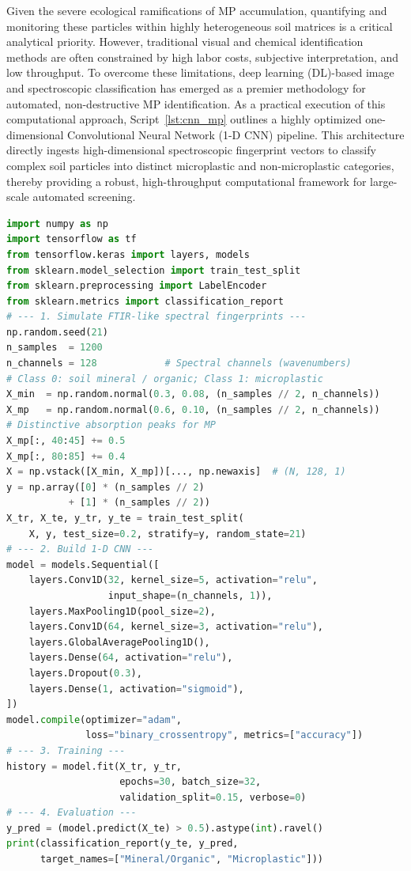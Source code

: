 \documentclass[environments,article,submit,pdftex,moreauthors]{Definitions/mdpi}
\begin{document}
Given the severe ecological ramifications of MP accumulation, quantifying and monitoring these particles within highly heterogeneous soil matrices is a critical analytical priority. However, traditional visual and chemical identification methods are often constrained by high labor costs, subjective interpretation, and low throughput. To overcome these limitations, deep learning (DL)-based image and spectroscopic classification has emerged as a premier methodology for automated, non-destructive MP identification. As a practical execution of this computational approach, Script~\ref{lst:cnn_mp} outlines a highly optimized one-dimensional Convolutional Neural Network (1-D CNN) pipeline. This architecture directly ingests high-dimensional spectroscopic fingerprint vectors to classify complex soil particles into distinct microplastic and non-microplastic categories, thereby providing a robust, high-throughput computational framework for large-scale automated screening.

\begin{lstlisting}[language=Python,basicstyle=\scriptsize\ttfamily,
    caption={Python workflow: 1-D Convolutional Neural Network (CNN) for
             microplastic classification from spectral fingerprints
             (Script~3).},
    label={lst:cnn_mp}]
import numpy as np
import tensorflow as tf
from tensorflow.keras import layers, models
from sklearn.model_selection import train_test_split
from sklearn.preprocessing import LabelEncoder
from sklearn.metrics import classification_report
# --- 1. Simulate FTIR-like spectral fingerprints ---
np.random.seed(21)
n_samples  = 1200
n_channels = 128            # Spectral channels (wavenumbers)
# Class 0: soil mineral / organic; Class 1: microplastic
X_min  = np.random.normal(0.3, 0.08, (n_samples // 2, n_channels))
X_mp   = np.random.normal(0.6, 0.10, (n_samples // 2, n_channels))
# Distinctive absorption peaks for MP
X_mp[:, 40:45] += 0.5
X_mp[:, 80:85] += 0.4
X = np.vstack([X_min, X_mp])[..., np.newaxis]  # (N, 128, 1)
y = np.array([0] * (n_samples // 2)
           + [1] * (n_samples // 2))
X_tr, X_te, y_tr, y_te = train_test_split(
    X, y, test_size=0.2, stratify=y, random_state=21)
# --- 2. Build 1-D CNN ---
model = models.Sequential([
    layers.Conv1D(32, kernel_size=5, activation="relu",
                  input_shape=(n_channels, 1)),
    layers.MaxPooling1D(pool_size=2),
    layers.Conv1D(64, kernel_size=3, activation="relu"),
    layers.GlobalAveragePooling1D(),
    layers.Dense(64, activation="relu"),
    layers.Dropout(0.3),
    layers.Dense(1, activation="sigmoid"),
])
model.compile(optimizer="adam",
              loss="binary_crossentropy", metrics=["accuracy"])
# --- 3. Training ---
history = model.fit(X_tr, y_tr,
                    epochs=30, batch_size=32,
                    validation_split=0.15, verbose=0)
# --- 4. Evaluation ---
y_pred = (model.predict(X_te) > 0.5).astype(int).ravel()
print(classification_report(y_te, y_pred,
      target_names=["Mineral/Organic", "Microplastic"]))
\end{lstlisting}
\end{document}
